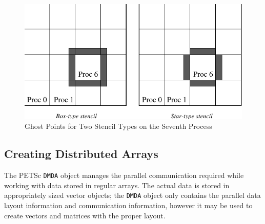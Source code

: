\begin{figure}[tb]
\centerline{ \includegraphics{ghost}}
\caption{Ghost Points for Two Stencil Types on the Seventh Process}
\label{fig_ghosts}
\end{figure}

\subsection{Creating Distributed Arrays}

The PETSc \lstinline{DMDA} object manages the parallel communication required
while working with data stored in regular arrays. The actual data
is stored in appropriately sized vector objects; the \lstinline{DMDA} object
only contains the parallel data layout information and communication
information, however it may be used to create vectors and matrices with the
proper layout.

